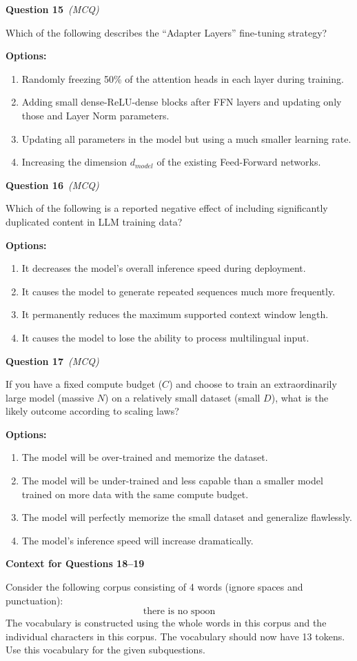 \documentclass[11pt]{article}
\newcommand{\q}[2]{\vspace{0.5em}\noindent\textbf{Question #1}\if\relax\detokenize{#2}\relax\else\ \textit{(#2)}\fi\par}
\newcommand{\opts}{\textbf{Options:}}
\newcommand{\contexthead}[1]{\vspace{0.6em}\noindent\textbf{Context for Questions #1}\par}
\begin{document}
\q{15}{MCQ}
Which of the following describes the ``Adapter Layers'' fine-tuning strategy?

\opts
\begin{enumerate}[label=(\alph*)]
\item Randomly freezing 50\% of the attention heads in each layer during training.
\item Adding small dense-ReLU-dense blocks after FFN layers and updating only those and Layer Norm parameters.
\item Updating all parameters in the model but using a much smaller learning rate.
\item Increasing the dimension $d_{model}$ of the existing Feed-Forward networks.
\end{enumerate}

\q{16}{MCQ}
Which of the following is a reported negative effect of including significantly duplicated content in LLM training data?

\opts
\begin{enumerate}[label=(\alph*)]
\item It decreases the model's overall inference speed during deployment.
\item It causes the model to generate repeated sequences much more frequently.
\item It permanently reduces the maximum supported context window length.
\item It causes the model to lose the ability to process multilingual input.
\end{enumerate}

\q{17}{MCQ}
If you have a fixed compute budget ($C$) and choose to train an extraordinarily large model (massive $N$) on a relatively small dataset (small $D$), what is the likely outcome according to scaling laws?

\opts
\begin{enumerate}[label=(\alph*)]
\item The model will be over-trained and memorize the dataset.
\item The model will be under-trained and less capable than a smaller model trained on more data with the same compute budget.
\item The model will perfectly memorize the small dataset and generalize flawlessly.
\item The model's inference speed will increase dramatically.
\end{enumerate}

\contexthead{18--19}
Consider the following corpus consisting of 4 words (ignore spaces and punctuation):
\[
\text{there is no spoon}
\]
The vocabulary is constructed using the whole words in this corpus and the individual characters in this corpus. The vocabulary should now have 13 tokens. Use this vocabulary for the given subquestions.
\end{document}
